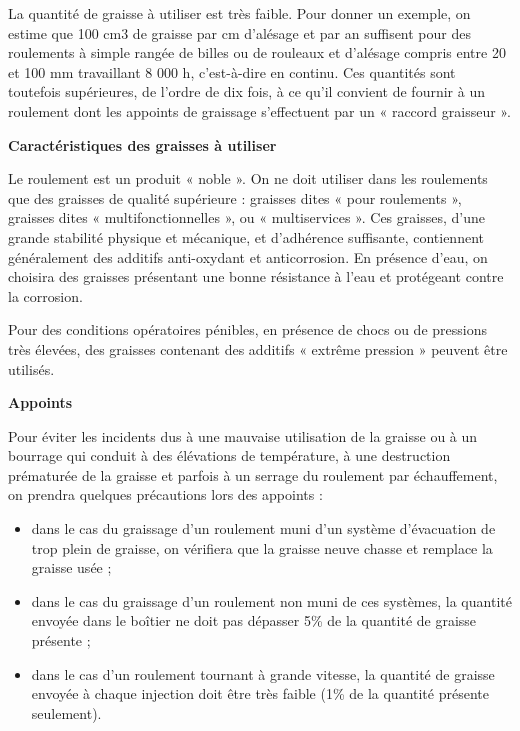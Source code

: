 La quantité de graisse à utiliser est très faible. Pour donner un exemple, on estime que 100 cm3 de graisse par cm d’alésage et par an suffisent pour des roulements à simple rangée de billes ou de rouleaux et d’alésage compris entre 20 et 100 mm travaillant 8 000 h, c’est-à-dire en continu. Ces quantités sont toutefois supérieures, de l’ordre de dix fois, à ce qu’il convient de fournir à un roulement dont les appoints de graissage s’effectuent par un « raccord graisseur ».


\vspace{0.3cm}
\textbf{Caractéristiques des graisses à utiliser}
\vspace{0.3cm}

Le roulement est un produit « noble ». On ne doit utiliser dans les roulements que des graisses de qualité supérieure : graisses dites « pour roulements », graisses dites « multifonctionnelles », ou « multiservices ». Ces graisses, d’une grande stabilité physique et mécanique, et d’adhérence suffisante, contiennent généralement des additifs anti-oxydant et anticorrosion.
En présence d’eau, on choisira des graisses présentant une bonne résistance à l’eau et protégeant contre la corrosion.
\vspace{0.3cm}

Pour des conditions opératoires pénibles, en présence de chocs ou de pressions très élevées, des graisses contenant des additifs « extrême pression » peuvent être utilisés.


\vspace{0.3cm}
\textbf{Appoints}
\vspace{0.3cm}

Pour éviter les incidents dus à une mauvaise utilisation de la graisse ou à un bourrage qui conduit à des élévations de température, à une destruction prématurée de la graisse et parfois à un serrage du roulement par échauffement, on prendra quelques précautions lors des appoints :


\begin{itemize}
\item  dans le cas du graissage d’un roulement muni d’un système d’évacuation de trop plein de graisse, on vérifiera que la graisse neuve chasse et remplace la graisse usée ;
\item  dans le cas du graissage d’un roulement non muni de ces systèmes, la quantité envoyée dans le boîtier ne doit pas dépasser 5\% de la quantité de graisse présente ;
\item  dans le cas d’un roulement tournant à grande vitesse, la quantité de graisse envoyée à chaque injection doit être très faible (1\% de la quantité présente seulement).

\end{itemize}

